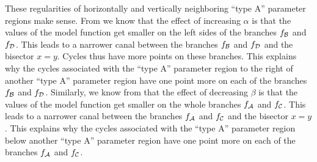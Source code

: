 These regularities of horizontally and vertically neighboring ``type A'' parameter regions make sense.
From  we know that the effect of increasing $\alpha$ is that the values of the model function get smaller on the left sides of the branches $f_{\mathcal{B}}$ and $f_{\mathcal{D}}$.
This leads to a narrower canal between the branches $f_{\mathcal{B}}$ and $f_{\mathcal{D}}$ and the bisector $x = y$.
Cycles thus have more points on these branches.
This explains why the cycles associated with the ``type A'' parameter region to the right of another ``type A'' parameter region have one point more on each of the branches $f_{\mathcal{B}}$ and $f_{\mathcal{D}}$.
Similarly, we know from  that the effect of decreasing $\beta$ is that the values of the model function get smaller on the whole branches $f_{\mathcal{A}}$ and $f_{\mathcal{C}}$.
This leads to a narrower canal between the branches $f_{\mathcal{A}}$ and $f_{\mathcal{C}}$ and the bisector $x = y$.
This explains why the cycles associated with the ``type A'' parameter region below another ``type A'' parameter region have one point more on each of the branches $f_{\mathcal{A}}$ and $f_{\mathcal{C}}$.
